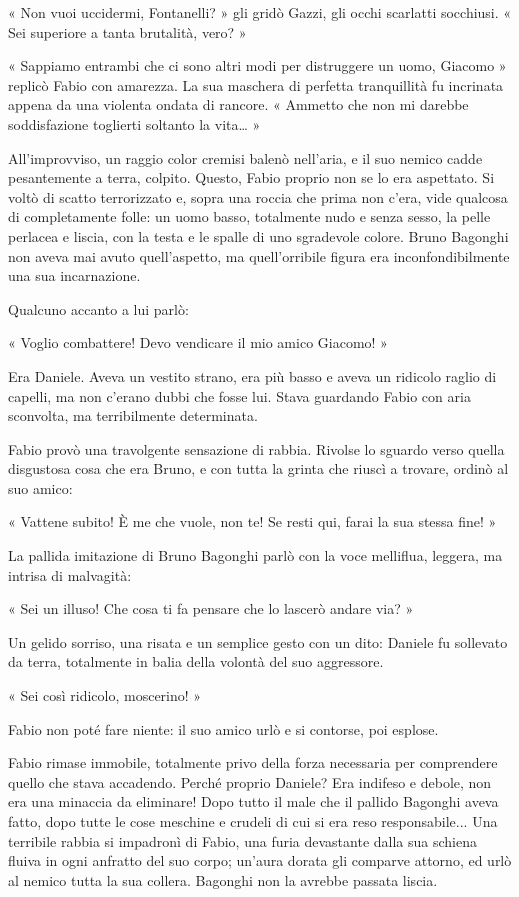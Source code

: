 « Non vuoi uccidermi, Fontanelli? » gli gridò Gazzi, gli occhi scarlatti socchiusi. « Sei superiore a tanta brutalità, vero? »

« Sappiamo entrambi che ci sono altri modi per distruggere un uomo, Giacomo » replicò Fabio con amarezza. La sua maschera di perfetta tranquillità fu incrinata appena da una violenta ondata di rancore. « Ammetto che non mi darebbe soddisfazione toglierti soltanto la vita… »

All'improvviso, un raggio color cremisi balenò nell'aria, e il suo nemico cadde pesantemente a terra, colpito. Questo, Fabio proprio non se lo era aspettato. Si voltò di scatto terrorizzato e, sopra una roccia che prima non c'era, vide qualcosa di completamente folle: un uomo basso, totalmente nudo e senza sesso, la pelle perlacea e liscia, con la testa e le spalle di uno sgradevole colore. Bruno Bagonghi non aveva mai avuto quell'aspetto, ma quell'orribile figura era inconfondibilmente una sua incarnazione.

Qualcuno accanto a lui parlò:

« Voglio combattere! Devo vendicare il mio amico Giacomo! »

Era Daniele. Aveva un vestito strano, era più basso e aveva un ridicolo raglio di capelli, ma non c'erano dubbi che fosse lui. Stava guardando Fabio con aria sconvolta, ma terribilmente determinata.

Fabio provò una travolgente sensazione di rabbia. Rivolse lo sguardo verso quella disgustosa cosa che era Bruno, e con tutta la grinta che riuscì a trovare, ordinò al suo amico:

« Vattene subito! È me che vuole, non te! Se resti qui, farai la sua stessa fine! »

La pallida imitazione di Bruno Bagonghi parlò con la voce melliflua, leggera, ma intrisa di malvagità:

« Sei un illuso! Che cosa ti fa pensare che lo lascerò andare via? »

Un gelido sorriso, una risata e un semplice gesto con un dito: Daniele fu sollevato da terra, totalmente in balia della volontà del suo aggressore.

« Sei così ridicolo, moscerino! »

Fabio non poté fare niente: il suo amico urlò e si contorse, poi esplose.

Fabio rimase immobile, totalmente privo della forza necessaria per comprendere quello che stava accadendo. Perché proprio Daniele? Era indifeso e debole, non era una minaccia da eliminare! Dopo tutto il male che il pallido Bagonghi aveva fatto, dopo tutte le cose meschine e crudeli di cui si era reso responsabile... Una terribile rabbia si impadronì di Fabio, una furia devastante dalla sua schiena fluiva in ogni anfratto del suo corpo; un'aura dorata gli comparve attorno, ed urlò al nemico tutta la sua collera. Bagonghi non la avrebbe passata liscia.

